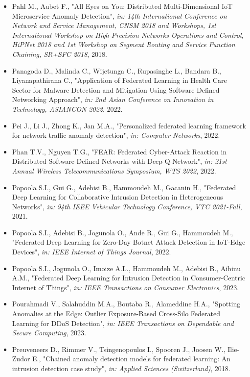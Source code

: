 \begin{itemize}
  \item Pahl M., Aubet F., "All Eyes on You: Distributed Multi-Dimensional IoT Microservice Anomaly Detection", \textit{in: 14th International Conference on Network and Service Management, CNSM 2018 and Workshops, 1st International Workshop on High-Precision Networks Operations and Control, HiPNet 2018 and 1st Workshop on Segment Routing and Service Function Chaining, SR+SFC 2018}, 2018.
  \item Panagoda D., Malinda C., Wijetunga C., Rupasinghe L., Bandara B., Liyanapathirana C., "Application of Federated Learning in Health Care Sector for Malware Detection and Mitigation Using Software Defined Networking Approach", \textit{in: 2nd Asian Conference on Innovation in Technology, ASIANCON 2022}, 2022.
  \item Pei J., Li J., Zhong K., Jan M.A., "Personalized federated learning framework for network traffic anomaly detection", \textit{in: Computer Networks}, 2022.
  \item Phan T.V., Nguyen T.G., "FEAR: Federated Cyber-Attack Reaction in Distributed Software-Defined Networks with Deep Q-Network", \textit{in: 21st Annual Wireless Telecommunications Symposium, WTS 2022}, 2022.
  \item Popoola S.I., Gui G., Adebisi B., Hammoudeh M., Gacanin H., "Federated Deep Learning for Collaborative Intrusion Detection in Heterogeneous Networks", \textit{in: 94th IEEE Vehicular Technology Conference, VTC 2021-Fall}, 2021.
  \item Popoola S.I., Adebisi B., Jogunola O., Ande R., Gui G., Hammoudeh M., "Federated Deep Learning for Zero-Day Botnet Attack Detection in IoT-Edge Devices", \textit{in: IEEE Internet of Things Journal}, 2022.
  \item Popoola S.I., Jogunola O., Imoize A.L., Hammoudeh M., Adebisi B., Aibinu A.M., "Federated Deep Learning for Intrusion Detection in Consumer-Centric Internet of Things", \textit{in: IEEE Transactions on Consumer Electronics}, 2023.
  \item Pourahmadi V., Salahuddin M.A., Boutaba R., Alameddine H.A., "Spotting Anomalies at the Edge: Outlier Exposure-Based Cross-Silo Federated Learning for DDoS Detection", \textit{in: IEEE Transactions on Dependable and Secure Computing}, 2023.
  \item Preuveneers D., Rimmer V., Tsingenopoulos I., Spooren J., Joosen W., Ilie-Zudor E., "Chained anomaly detection models for federated learning: An intrusion detection case study", \textit{in: Applied Sciences (Switzerland)}, 2018.

\end{itemize}
